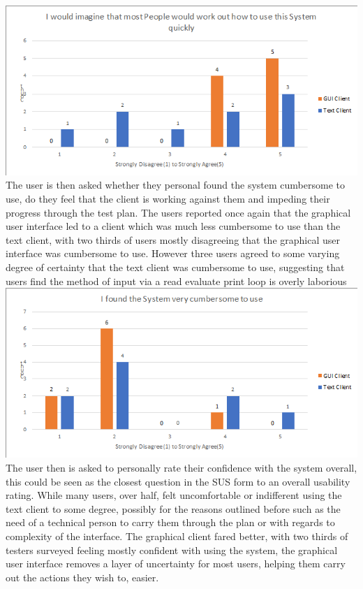 \documentclass{article}
\begin{document}
\\
\includegraphics[width=\textwidth]{graph7.PNG}
The user is then asked whether they personal found the system cumbersome to use, do they feel that the client is working against them and impeding their progress through the test plan. The users reported once again that the graphical user interface led to a client which was much less cumbersome to use than the text client, with two thirds of users mostly disagreeing that the graphical user interface was cumbersome to use. However three users agreed to some varying degree of certainty that the text client was cumbersome to use, suggesting that users find the method of input via a read evaluate print loop is overly laborious
\\
\includegraphics[width=\textwidth]{graph8.PNG}
The user then is asked to personally rate their confidence with the system overall, this could be seen as the closest question in the SUS form to an overall usability rating. While many users, over half, felt uncomfortable or indifferent using the text client to some degree, possibly for the reasons outlined before such as the need of a technical person to carry them through the plan or with regards to complexity of the interface. The graphical client fared better, with two thirds of testers surveyed feeling mostly confident with using the system, the graphical user interface removes a layer of uncertainty for most users, helping them carry out the actions they wish to, easier. 
\end{document}
